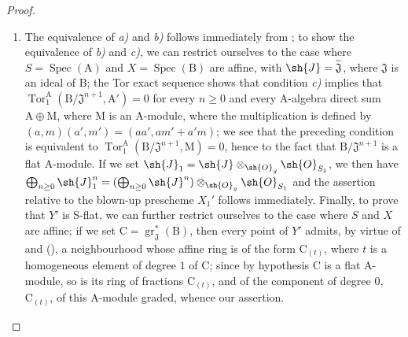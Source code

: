 \begin{proof}
\begin{enumerate}[label=(\roman*)]
  \item The equivalence of \emph{a)} and \emph{b)} follows immediately from ; to show the equivalence of \emph{b)} and \emph{c)}, we can restrict ourselves to the case where $S=\operatorname{Spec}(\mathrm{A})$ and $X=\operatorname{Spec}(\mathrm{B})$ are affine, with $\sh{J}=\widetilde{\mathfrak{J}}$, where $\mathfrak{J}$ is an ideal of $\mathrm{B}$; the Tor exact sequence shows that condition \emph{c)} implies that $\operatorname{Tor}_1^{\mathrm{A}}(\mathrm{B}/\mathfrak{J}^{n+1},\mathrm{A}')=0$ for every $n\geq 0$ and every $\mathrm{A}$-algebra direct sum $\mathrm{A}\oplus\mathrm{M}$, where $\mathrm{M}$ is an $\mathrm{A}$-module, where the multiplication is defined by $(a,m)(a',m')=(aa',am'+a'm)$; we see that the preceding condition is equivalent to $\operatorname{Tor}_1^{\mathrm{A}}(\mathrm{B}/\mathfrak{J}^{n+1},\mathrm{M})=0$, hence to the fact that $\mathrm{B}/\mathfrak{J}^{n+1}$ is a flat $\mathrm{A}$-module.
If we set $\sh{J}_1=\sh{J}\otimes_{\sh{O}_g}\sh{O}_{S_1}$, we then have $\bigoplus_{n\geq 0}\sh{J}_1^n=(\bigoplus_{n\geq 0}\sh{J}^n)\otimes_{\sh{O}_g}\sh{O}_{S_1}$ and the assertion relative to the blown-up prescheme $X_1'$ follows immediately.
Finally, to prove that $Y'$ is S-flat, we can further restrict ourselves to the case where $S$ and $X$ are affine; if we set $\mathrm{C}=\operatorname{gr}_\mathfrak{J}^*(\mathrm{B})$, then every point of $Y'$ admits, by virtue of  and (), a neighbourhood whose affine ring is of the form $\mathrm{C}_{(t)}$, where $t$ is a homogeneous element of degree $1$ of $\mathrm{C}$; since by hypothesis $\mathrm{C}$ is a flat $\mathrm{A}$-module, so is its ring of fractions $\mathrm{C}_{(t)}$, and of the component of degree $0$, $\mathrm{C}_{(t)}$, of this $\mathrm{A}$-module graded, whence our assertion.


\end{enumerate}
\end{proof}
